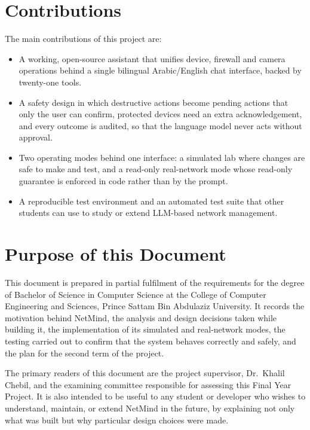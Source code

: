 \section{Contributions}

The main contributions of this project are:

\begin{itemize}[itemsep=2pt]
  \item A working, open-source assistant that unifies device, firewall and
  camera operations behind a single bilingual Arabic/English chat interface,
  backed by twenty-one tools.
  \item A safety design in which destructive actions become pending actions
  that only the user can confirm, protected devices need an extra
  acknowledgement, and every outcome is audited, so that the language model
  never acts without approval.
  \item Two operating modes behind one interface: a simulated lab where
  changes are safe to make and test, and a read-only real-network mode whose
  read-only guarantee is enforced in code rather than by the prompt.
  \item A reproducible test environment and an automated test suite that
  other students can use to study or extend LLM-based network management.
\end{itemize}

\section{Purpose of this Document}

This document is prepared in partial fulfilment of the requirements for the
degree of Bachelor of Science in Computer Science at the College of Computer
Engineering and Sciences, Prince Sattam Bin Abdulaziz University. It records
the motivation behind NetMind, the analysis and design decisions taken while
building it, the implementation of its simulated and real-network modes, the
testing carried out to confirm that the system behaves correctly and safely,
and the plan for the second term of the project.

The primary readers of this document are the project supervisor,
Dr.\ Khalil Chebil, and the examining committee responsible for assessing
this Final Year Project. It is also intended to be useful to any student or
developer who wishes to understand, maintain, or extend NetMind in the
future, by explaining not only what was built but why particular design
choices were made.

